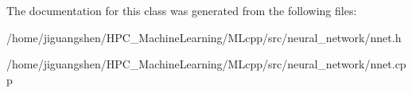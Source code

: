 The documentation for this class was generated from the following files\-:\begin{DoxyCompactItemize}
\item 
/home/jiguangshen/\-H\-P\-C\-\_\-\-Machine\-Learning/\-M\-Lcpp/src/neural\-\_\-network/nnet.\-h\item 
/home/jiguangshen/\-H\-P\-C\-\_\-\-Machine\-Learning/\-M\-Lcpp/src/neural\-\_\-network/nnet.\-cpp\end{DoxyCompactItemize}
